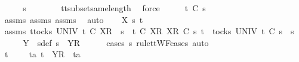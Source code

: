\ \ \isamarkupfalse%
\ \isamarkupfalse%
\ {\isachardoublequoteopen}s{}{\isacharprime}\ {\isacharequal}\ {\isacharbrackleft}{\isacharbrackright}{\isachardoublequoteclose}\isanewline
\ \ \ \ \isamarkupfalse%
\ tt{\isacharunderscore}subset{\isacharunderscore}same{\isacharunderscore}length\ \isamarkupfalse%
\ force\isanewline
\ \ \isamarkupfalse%
\ \isamarkupfalse%
\ {\isachardoublequoteopen}t\ {\isasymle}\isactrlsub C\ s{}{\isacharprime}{\isachardoublequoteclose}\isanewline
\ \ \ \ \isamarkupfalse%
\ assms{\isacharparenleft}{}{\isacharparenright}\ assms{\isacharparenleft}{}{\isacharparenright}\ assms{\isacharparenleft}{}{\isacharparenright}\ \isamarkupfalse%
\ auto\isanewline
{}\isamarkupfalse%
\isanewline
\ \ \isamarkupfalse%
\ X\ s{}{\isacharprime}\ t\isanewline
\ \ \isamarkupfalse%
\ assms{\isacharcolon}\ {\isachardoublequoteopen}{\isasymforall}t{\isasymin}tocks\ UNIV{\isachardot}\ t\ {\isasymle}\isactrlsub C\ {\isacharbrackleft}{\isacharbrackleft}X{\isacharbrackright}\isactrlsub R{\isacharbrackright}\ {\isacharat}\ s{}\ {\isasymlongrightarrow}\ t\ {\isasymle}\isactrlsub C\ {\isacharbrackleft}{\isacharbrackleft}X{\isacharbrackright}\isactrlsub R{\isacharbrackright}{\isachardoublequoteclose}\ {\isachardoublequoteopen}{\isacharbrackleft}{\isacharbrackleft}X{\isacharbrackright}\isactrlsub R{\isacharbrackright}\ {\isasymsubseteq}\isactrlsub C\ s{}{\isacharprime}{\isachardoublequoteclose}\ {\isachardoublequoteopen}t\ {\isasymin}\ tocks\ UNIV{\isachardoublequoteclose}\ {\isachardoublequoteopen}t\ {\isasymle}\isactrlsub C\ s{}{\isacharprime}\ {\isacharat}\ s{}{\isachardoublequoteclose}\isanewline
\ \ \isamarkupfalse%
\ \isamarkupfalse%
\ Y\ \ s{}{\isacharprime}{\isacharunderscore}def{\isacharcolon}\ {\isachardoublequoteopen}s{}{\isacharprime}\ {\isacharequal}\ {\isacharbrackleft}{\isacharbrackleft}Y{\isacharbrackright}\isactrlsub R{\isacharbrackright}{\isachardoublequoteclose}\isanewline
\ \ \ \ \isamarkupfalse%
\ {\isacharparenleft}cases\ s{}{\isacharprime}\ rule{\isacharcolon}ttWF{\isachardot}cases{\isacharcomma}\ auto{\isacharparenright}\isanewline
\ \ \isamarkupfalse%
\ \isamarkupfalse%
\ {\isachardoublequoteopen}t\ {\isacharequal}\ {\isacharbrackleft}{\isacharbrackright}\ {\isasymor}\ {\isacharparenleft}{\isasymexists}\ ta{\isachardot}\ t\ {\isacharequal}\ {\isacharbrackleft}Y{\isacharbrackright}\isactrlsub R\ {\isacharhash}\ ta{\isacharparenright}{\isachardoublequoteclose}\isanewline
